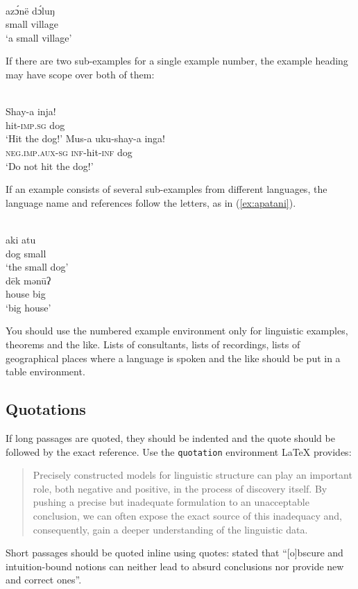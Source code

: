 {\def\exfont{\normalsize\itshape}
\ea\label{ex-typology}
\\
\gll azɔ́në dɔ́luŋ\\
     small village\\ 
\glt `a small village' 
\z


If there are two sub-examples for a single example number, the example heading may have scope over both of them:

\ea
{}\\
\ea
\gll Shay-a		inja!\\
hit-\textsc{imp.sg}	dog\\
\glt `Hit the dog!'
\ex
\gll	Mus-a	uku-shay-a	inga! \\
	\textsc{neg.imp.aux-sg}	\textsc{inf}-hit-\textsc{inf}	dog \\
\glt		`Do not hit the dog!'	
\z
\z

If an example consists of several sub-examples from different languages, the language name and references follow the letters, as in (\ref{ex:apatani}).

\ea\label{ex:apatani}
\ea
{}\\
\gll aki atu\\ 
     dog small\\ 
\glt ‘the small dog’ 
\ex 
{}\\ 
\gll dēk mənūʔ\\
     house big\\
\glt ‘big house’ 
\z
\z

You should use the numbered example environment only for linguistic examples, theorems and the like. Lists of consultants, lists of recordings, lists of geographical places where a language is spoken and the like should be put in a table environment. 


\subsection{Quotations}

If long passages are quoted, they should be indented and the quote should be followed by the exact reference. Use the \verb+quotation+ environment \LaTeX\xspace provides:
\begin{quote}
Precisely constructed models for linguistic structure can play an
important role, both negative and positive, in the process of discovery 
itself. By pushing a precise but inadequate formulation to
an unacceptable conclusion, we can often expose the exact source
of this inadequacy and, consequently, gain a deeper understanding
of the linguistic data.
\citep[5]{Chomsky57a}
\end{quote}
%
Short passages should be quoted inline using quotes: \citet[5]{Chomsky57a} stated that ``[o]bscure
  and intuition-bound notions can neither lead to absurd conclusions nor provide new and
correct ones''.

}
